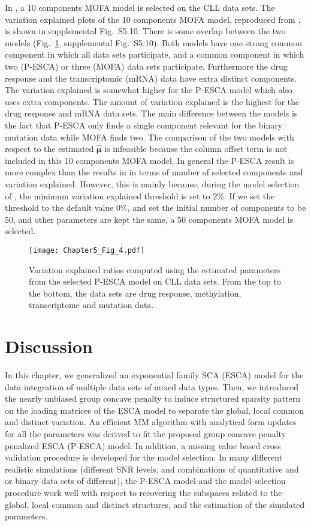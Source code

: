 In \cite{argelaguet2018multi}, a 10 components MOFA model is selected on the CLL data sets. The variation explained plots of the 10 components MOFA model, reproduced from \cite{argelaguet2018multi}, is shown in supplemental Fig.~S5.10. There is some overlap between the two models (Fig.~\ref{chapter5_fig:4}, supplemental Fig.~S5.10). Both models have one strong common component in which all data sets participate, and a common component in which two (P-ESCA) or three (MOFA) data sets participate. Furthermore the drug response and the transcriptomic (mRNA) data have extra distinct components. The variation explained is somewhat higher for the P-ESCA model which also uses extra components. The amount of variation explained is the highest for the drug response and mRNA data sets. The main difference between the models is the fact that P-ESCA only finds a single component relevant for the binary mutation data while MOFA finds two. The comparison of the two models with respect to the estimated $\hat{\bm{\mu}}$ is infeasible because the column offset term is not included in this 10 components MOFA model. In general the P-ESCA result is more complex than the results in \cite{argelaguet2018multi} in terms of number of selected components and variation explained. However, this is mainly because, during the model selection of \cite{argelaguet2018multi}, the minimum variation explained threshold is set to 2\%. If we set the threshold to the default value 0\%, and set the initial number of components to be 50, and other parameters are kept the same, a 50 components MOFA model is selected.

\begin{figure}[h]
    \centering
    \texttt{[image: Chapter5\_Fig\_4.pdf]}
    \caption{Variation explained ratios computed using the estimated parameters from the selected P-ESCA model on CLL data sets. From the top to the bottom, the data sets are drug response, methylation, transcriptome and mutation data.}
	\label{chapter5_fig:4}
\end{figure}

\section{Discussion}
In this chapter, we generalized an exponential family SCA (ESCA) model for the data integration of multiple data sets of mixed data types. Then, we introduced the nearly unbiased group concave penalty to induce structured sparsity pattern on the loading matrices of the ESCA model to separate the global, local common and distinct variation. An efficient MM algorithm with analytical form updates for all the parameters was derived to fit the proposed group concave penalty penalized ESCA (P-ESCA) model. In addition, a missing value based cross validation procedure is developed for the model selection. In many different realistic simulations (different SNR levels, and combinations of quantitative and or binary data sets of different), the P-ESCA model and the model selection procedure work well with respect to recovering the subspaces related to the global, local common and distinct structures, and the estimation of the simulated parameters.

